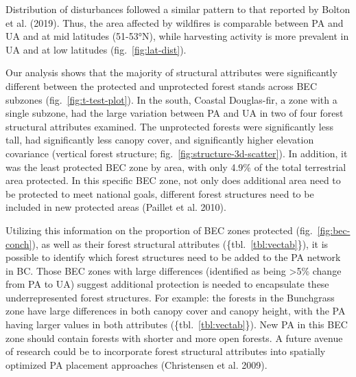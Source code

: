 \documentclass[11pt]{article}
\begin{document}
Distribution of disturbances followed a similar pattern to that reported
by Bolton et al. (2019). Thus, the area affected by wildfires is
comparable between PA and UA and at mid latitudes (51-53°N), while
harvesting activity is more prevalent in UA and at low latitudes
(fig.~\ref{fig:lat-dist}).

Our analysis shows that the majority of structural attributes were
significantly different between the protected and unprotected forest
stands across BEC subzones (fig.~\ref{fig:t-test-plot}). In the south,
Coastal Douglas-fir, a zone with a single subzone, had the large
variation between PA and UA in two of four forest structural attributes
examined. The unprotected forests were significantly less tall, had
significantly less canopy cover, and significantly higher elevation
covariance (vertical forest structure;
fig.~\ref{fig:structure-3d-scatter}). In addition, it was the least
protected BEC zone by area, with only 4.9\% of the total terrestrial
area protected. In this specific BEC zone, not only does additional area
need to be protected to meet national goals, different forest structures
need to be included in new protected areas (Paillet et al. 2010).

Utilizing this information on the proportion of BEC zones protected
(fig.~\ref{fig:bec-conch}), as well as their forest structural
attributes (\{tbl.~\ref{tbl:vectab}\}), it is possible to identify which
forest structures need to be added to the PA network in BC. Those BEC
zones with large differences (identified as being \textgreater5\% change
from PA to UA) suggest additional protection is needed to encapsulate
these underrepresented forest structures. For example: the forests in
the Bunchgrass zone have large differences in both canopy cover and
canopy height, with the PA having larger values in both attributes
(\{tbl.~\ref{tbl:vectab}\}). New PA in this BEC zone should contain
forests with shorter and more open forests. A future avenue of research
could be to incorporate forest structural attributes into spatially
optimized PA placement approaches (Christensen et al. 2009).
\end{document}
